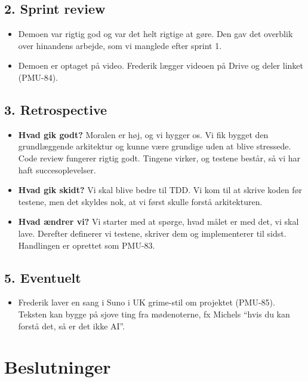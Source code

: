 \documentclass[a4paper,11pt]{article}
\begin{document}
\subsection*{2. Sprint review}

\begin{itemize}
    \item Demoen var rigtig god og var det helt rigtige at gøre. Den gav det overblik over hinandens arbejde, som vi manglede efter sprint 1.
    \item Demoen er optaget på video. Frederik lægger videoen på Drive og deler linket (PMU-84).
\end{itemize}

\subsection*{3. Retrospective}

\begin{itemize}
    \item \textbf{Hvad gik godt?} Moralen er høj, og vi hygger os. Vi fik bygget den grundlæggende arkitektur og kunne være grundige uden at blive stressede. Code review fungerer rigtig godt. Tingene virker, og testene består, så vi har haft succesoplevelser.
    \item \textbf{Hvad gik skidt?} Vi skal blive bedre til TDD. Vi kom til at skrive koden før testene, men det skyldes nok, at vi først skulle forstå arkitekturen.
    \item \textbf{Hvad ændrer vi?} Vi starter med at spørge, hvad målet er med det, vi skal lave. Derefter definerer vi testene, skriver dem og implementerer til sidst. Handlingen er oprettet som PMU-83.
\end{itemize}

\subsection*{5. Eventuelt}

\begin{itemize}
    \item Frederik laver en sang i Suno i UK grime-stil om projektet (PMU-85). Teksten kan bygge på sjove ting fra mødenoterne, fx Michels ``hvis du kan forstå det, så er det ikke AI''.
\end{itemize}

\section*{Beslutninger}
\end{document}
